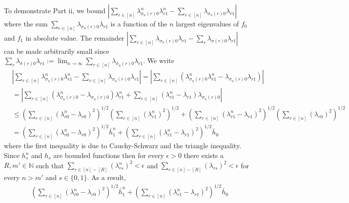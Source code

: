 \documentclass[12pt]{article}
\theoremstyle{definition}
\begin{document}
\begin{flushleft}
To demonstrate Part ii, we bound $\left|\sum_{r \in [n]}\lambda^{n}_{\sigma_{n}(r)0}\lambda^{n}_{r1} - \sum_{r\in[n]}\lambda_{\sigma_{n}(r)0}\lambda_{r1}\right|$ where the sum $\sum_{r\in[n]}\lambda_{\sigma_{n}(r)0}\lambda_{r1}$ is a function of the $n$ largest eigenvalues of $f_{0}$ and $f_{1}$ in absolute value. The remainder $\left|\sum_{r\in[n]}\lambda_{\sigma_{n}(r)0}\lambda_{r1} - \sum_{r}\lambda_{\sigma(r)0}\lambda_{r1}\right|$ can be made arbitrarily small since $\sum_{r}\lambda_{\sigma(r)0}\lambda_{r1} := \lim_{n \to \infty}\sum_{r\in[n]}\lambda_{\sigma_{n}(r)0}\lambda_{r1}$. We write
\begin{align*}
&\left|\sum_{r \in [n]}\lambda^{n}_{\sigma_{n}(r)0}\lambda^{n}_{r1} - \sum_{r\in[n]}\lambda_{\sigma_{n}(r)0}\lambda_{r1}\right|
= \left|\sum_{r \in [n]}\left(\lambda^{n}_{\sigma_{n}(r)0}\lambda^{n}_{r1} - \lambda_{\sigma_{n}(r)0}\lambda_{r1}\right)\right| \\
&= \left|\sum_{r \in [n]}\left(\lambda^{n}_{\sigma_{n}(r)0}-\lambda_{\sigma_{n}(r)0}\right)\lambda^{n}_{r1} + \sum_{r \in [n]}\left(\lambda^{n}_{r1}-\lambda_{r1}\right)\lambda_{\sigma_{n}(r)0}\right| \\
&\leq  \left(\sum_{r \in [n]}\left(\lambda^{n}_{r0}-\lambda_{r0}\right)^{2}\right)^{1/2}\left(\sum_{r \in [n]}\left(\lambda^{n}_{r1}\right)^{2}\right)^{1/2} + \left(\sum_{r \in [n]}\left(\lambda^{n}_{r1}-\lambda_{r1}\right)^{2}\right)^{1/2}\left(\sum_{r \in [n]}\left(\lambda_{r0}\right)^{2}\right)^{1/2} \\
&=  \left(\sum_{r \in [n]}\left(\lambda^{n}_{r0}-\lambda_{r0}\right)^{2}\right)^{1/2}\bar{h}^{n}_{1} + \left(\sum_{r \in [n]}\left(\lambda^{n}_{r1}-\lambda_{r1}\right)^{2}\right)^{1/2}\bar{h}_{0}
\end{align*}
where the first inequality is due to Cauchy-Schwarz and the triangle inequality. Since $h_{s}^{n}$ and $h_{s}$ are bounded functions then for every $\epsilon > 0$ there exists a $R,m' \in \mathbb{N}$ such that $\sum_{r \in [n]-[R]}\left(\lambda^{n}_{rs}\right)^{2} < \epsilon$ and $\sum_{r \in [n]-[R]}\left(\lambda_{rs}\right)^{2} < \epsilon$ for every $n > m'$ and $s \in \{0,1\}$. As a result, 
\begin{align*}
&\left(\sum_{r \in [n]}\left(\lambda^{n}_{r0}-\lambda_{r0}\right)^{2}\right)^{1/2}\bar{h}^{n}_{1} + \left(\sum_{r \in [n]}\left(\lambda^{n}_{r1}-\lambda_{r1}\right)^{2}\right)^{1/2}\bar{h}_{0}\\

\end{align*}
\end{flushleft}
\end{document}
